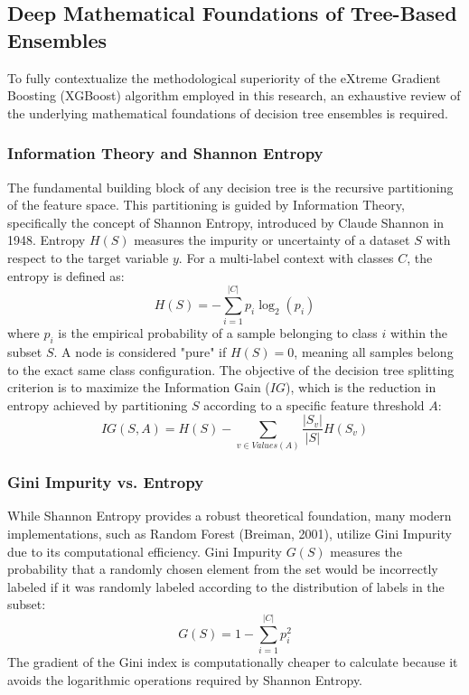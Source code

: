 \subsection{Deep Mathematical Foundations of Tree-Based Ensembles}

To fully contextualize the methodological superiority of the eXtreme Gradient Boosting (XGBoost) algorithm employed in this research, an exhaustive review of the underlying mathematical foundations of decision tree ensembles is required. 

\subsubsection{Information Theory and Shannon Entropy}
The fundamental building block of any decision tree is the recursive partitioning of the feature space. This partitioning is guided by Information Theory, specifically the concept of Shannon Entropy, introduced by Claude Shannon in 1948. Entropy $H(S)$ measures the impurity or uncertainty of a dataset $S$ with respect to the target variable $y$. For a multi-label \parencite{tsoumakas2007multi} context with classes $C$, the entropy is defined as:
\begin{equation}
    H(S) = - \sum_{i=1}^{|C|} p_i \log_2 (p_i)
\end{equation}
where $p_i$ is the empirical probability of a sample belonging to class $i$ within the subset $S$. A node is considered "pure" if $H(S) = 0$, meaning all samples belong to the exact same class configuration. The objective of the decision tree splitting criterion is to maximize the Information Gain ($IG$), which is the reduction in entropy achieved by partitioning $S$ according to a specific feature threshold $A$:
\begin{equation}
    IG(S, A) = H(S) - \sum_{v \in Values(A)} \frac{|S_v|}{|S|} H(S_v)
\end{equation}

\subsubsection{Gini Impurity vs. Entropy}
While Shannon Entropy provides a robust theoretical foundation, many modern implementations, such as Random Forest \parencite{breiman2001random} (Breiman, 2001), utilize Gini Impurity due to its computational efficiency. Gini Impurity $G(S)$ measures the probability that a randomly chosen element from the set would be incorrectly labeled if it was randomly labeled according to the distribution of labels in the subset:
\begin{equation}
    G(S) = 1 - \sum_{i=1}^{|C|} p_i^2
\end{equation}
The gradient of the Gini index is computationally cheaper to calculate because it avoids the logarithmic operations required by Shannon Entropy. 

